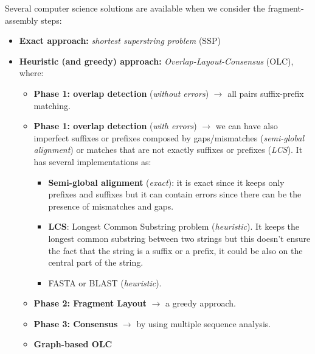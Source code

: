 \par \bigskip \noindent
Several computer science solutions are available when we consider the fragment-assembly steps:
\begin{itemize}
	\item \textbf{Exact approach:} \textit{shortest superstring problem} (SSP)
	\item \textbf{Heuristic (and greedy) approach:} \textit{Overlap-Layout-Consensus} (OLC), where:
	\begin{itemize}
		\item \textbf{Phase 1: overlap detection} (\textit{without errors}) $\rightarrow$ all pairs suffix-prefix matching.
		\item \textbf{Phase 1: overlap detection} (\textit{with errors}) $\rightarrow$ we can have also imperfect suffixes or prefixes composed by gaps/mismatches (\textit{semi-global alignment}) or matches that are not exactly suffixes or prefixes (\textit{LCS}). It has several implementations as: 
		\begin{itemize}
			\item \textbf{Semi-global alignment} (\textit{exact}): it is exact since it keeps only prefixes and suffixes but it can contain errors since there can be the presence of mismatches and gaps.
			\item \textbf{LCS}: Longest Common Substring problem (\textit{heuristic}). It keeps the longest common substring between two strings but this doesn't ensure the fact that the string is a suffix or a prefix, it could be also on the central part of the string.
			\item FASTA or BLAST (\textit{heuristic}).
		\end{itemize}
		\item \textbf{Phase 2: Fragment Layout} $\rightarrow$ a greedy approach.
		\item \textbf{Phase 3: Consensus} $\rightarrow$ by using multiple sequence analysis.
		\item \textbf{Graph-based OLC}
	\end{itemize}
\end{itemize}


